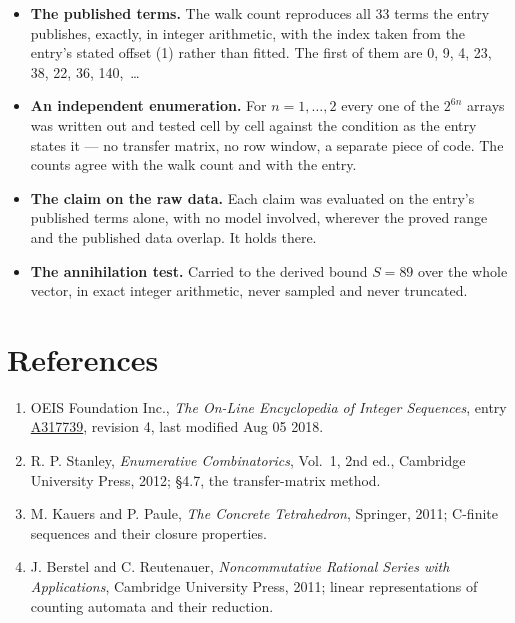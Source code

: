 \documentclass[11pt]{article}
\theoremstyle{definition}
\begin{document}
\begin{itemize}

\item {\bfseries The published terms.} The walk count reproduces all 33 terms the entry publishes, exactly, in integer arithmetic, with the index taken from the entry's stated offset (1) rather than fitted. The first of them are 0, 9, 4, 23, 38, 22, 36, 140,~\dots

\item {\bfseries An independent enumeration.} For $n = 1,\dots,2$ every one of the $2^{6n}$ arrays was written out and tested cell by cell against the condition as the entry states it --- no transfer matrix, no row window, a separate piece of code. The counts agree with the walk count and with the entry.

\item {\bfseries The claim on the raw data.} Each claim was evaluated on the entry's published terms alone, with no model involved, wherever the proved range and the published data overlap. It holds there.

\item {\bfseries The annihilation test.} Carried to the derived bound $S = 89$ over the whole vector, in exact integer arithmetic, never sampled and never truncated.

\end{itemize}

\section{References}

\begin{enumerate}

\item OEIS Foundation Inc., \emph{The On-Line Encyclopedia of Integer Sequences}, entry \href{https://oeis.org/A317739}{A317739}, revision 4, last modified Aug 05 2018.

\item R. P. Stanley, \emph{Enumerative Combinatorics}, Vol.~1, 2nd ed., Cambridge University Press, 2012; \S4.7, the transfer-matrix method.

\item M. Kauers and P. Paule, \emph{The Concrete Tetrahedron}, Springer, 2011; C-finite sequences and their closure properties.

\item J. Berstel and C. Reutenauer, \emph{Noncommutative Rational Series with Applications}, Cambridge University Press, 2011; linear representations of counting automata and their reduction.

\end{enumerate}
\end{document}

